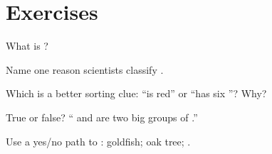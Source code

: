 \section{Exercises}

\begin{exercise}[$\star$]\label{exo:g3:classify:1}
What is ?
\end{exercise}

\begin{exercise}[$\star$]\label{exo:g3:classify:2}
Name one reason scientists classify .
\end{exercise}

\begin{exercise}[$\star$]\label{exo:g3:classify:3}
Which is a better sorting clue: ``is red'' or ``has six ''?
Why?
\end{exercise}

\begin{exercise}[$\star$]\label{exo:g3:classify:4}
True or false? `` and  are two big groups of .''
\end{exercise}

\begin{exercise}[$\star\star$]\label{exo:g3:classify:5}
Use a yes/no path to : goldfish; oak tree; .
\end{exercise}

